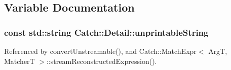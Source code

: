 \subsection{Variable Documentation}
\hypertarget{namespace_catch_1_1_detail_a466775f4eec29ffef29ab334cd885136}{
\subsubsection[{unprintable\-String}]{\setlength{\rightskip}{0pt plus 5cm}const std\-::string Catch\-::\-Detail\-::unprintable\-String}}\label{namespace_catch_1_1_detail_a466775f4eec29ffef29ab334cd885136}


Referenced by convert\-Unstreamable(), and Catch\-::\-Match\-Expr$<$ Arg\-T, Matcher\-T $>$\-::stream\-Reconstructed\-Expression().

